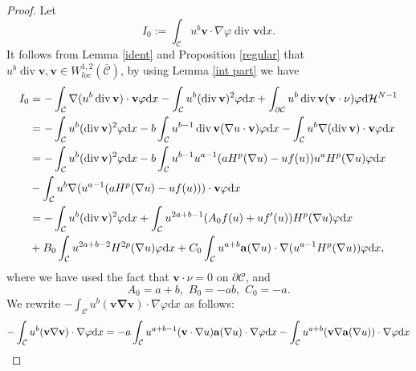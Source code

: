 \documentclass[12pt]{amsart}
\theoremstyle{definition}
\theoremstyle{remark}
\theoremstyle{conclusion}
\theoremstyle{conjecture}
\numberwithin{equation}{section}
\begin{document}
\begin{proof}
Let
$$I_0:=\int_{\mathcal{C}}u^b\mathbf{v}\cdot\nabla \varphi\operatorname{div}\mathbf{v}\mathrm{d}x.$$
It follows from Lemma \ref{ident} and Proposition \ref{regular} that $u^b\operatorname{div}\mathbf{v}, \mathbf{v}\in W^{1,2}_{loc}(\overline{\mathcal{C}})$, by using Lemma \ref{int part} we have
\begin{equation}\label{I0}
  \begin{aligned}
    I_0&=-\int_{\mathcal{C}}\nabla(u^b\operatorname{div}\mathbf{v})\cdot\mathbf{v}\varphi\mathrm{d}x-\int_{\mathcal{C}}u^b(\operatorname{div}\mathbf{v})^2\varphi\mathrm{d}x+\int_{\partial\mathcal{C}}u^b\operatorname{div}\mathbf{v}(\mathbf{v}\cdot\nu)\varphi\mathrm{d}\mathcal{H}^{N-1}\\
       &=-\int_{\mathcal{C}}u^b(\operatorname{div}\mathbf{v})^2\varphi\mathrm{d}x-b\int_{\mathcal{C}}u^{b-1}\operatorname{div}\mathbf{v}(\nabla u\cdot\mathbf{v})\varphi\mathrm{d}x-\int_{\mathcal{C}}u^b\nabla(\operatorname{div}\mathbf{v})\cdot\mathbf{v}\varphi\mathrm{d}x\\
       &=-\int_{\mathcal{C}}u^b(\operatorname{div}\mathbf{v})^2\varphi\mathrm{d}x-b\int_{\mathcal{C}}u^{b-1}u^{a-1}(aH^p(\nabla u)-uf(u))u^aH^p(\nabla u)\varphi\mathrm{d}x\\
       &-\int_{\mathcal{C}}u^b\nabla(u^{a-1}(aH^p(\nabla u)-uf(u)))\cdot\mathbf{v}\varphi\mathrm{d}x\\
       &=-\int_{\mathcal{C}}u^b(\operatorname{div}\mathbf{v})^2\varphi\mathrm{d}x+\int_{\mathcal{C}}u^{2a+b-1}(A_0f(u)+uf^{\prime}(u))H^p(\nabla u)\varphi\mathrm{d}x\\
       &+B_0\int_{\mathcal{C}}u^{2a+b-2}H^{2p}(\nabla u)\varphi\mathrm{d}x+C_0\int_{\mathcal{C}}u^{a+b}{\bf{a}}(\nabla u)\cdot\nabla(u^{a-1}H^p(\nabla u))\varphi\mathrm{d}x,
  \end{aligned}
\end{equation}
where we have used the fact that $\mathbf{v}\cdot\nu=0$ on $\partial\mathcal{C}$, and
$$A_0=a+b,\,\,B_0=-ab,\,\,C_0=-a.$$
We rewrite $-\int_{\mathcal{C}}u^b(\mathbf{v\nabla\mathbf{v}})\cdot\nabla\varphi\mathrm{d}x$ as follows:
\begin{equation*}
  \begin{aligned}
    -\int_{\mathcal{C}}u^b(\mathbf{v\nabla\mathbf{v}})\cdot\nabla\varphi\mathrm{d}x
    &=-a\int_{\mathcal{C}}u^{a+b-1}(\mathbf{v}\cdot\nabla u){\bf{a}}(\nabla u)\cdot\nabla\varphi\mathrm{d}x-\int_{\mathcal{C}}u^{a+b}(\mathbf{v}\nabla {\bf{a}}(\nabla u))\cdot\nabla\varphi\mathrm{d}x\\

\end{aligned}
\end{equation*}
\end{proof}
\end{document}
